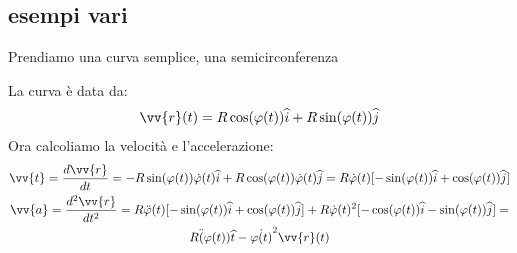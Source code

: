 \documentclass[a4paper, oneside]{article}
\begin{document}
    \subsection{esempi vari}
\begin{example}
        Prendiamo una curva semplice, una semicirconferenza
        \begin{center}
        \end{center}
        La curva è data da:
        \begin{gather*}
            \vv{r}(t) = R \cos(\varphi(t)) \widehat{i} + R \sin(\varphi(t)) \widehat{j}
        \end{gather*}
        Ora calcoliamo la velocità e l'accelerazione:
        \begin{gather*}
            \vv{t} = \frac{d\vv{r}}{dt} = - R \sin(\varphi(t)) \dot{\varphi}(t) \widehat{i} + R \cos(\varphi(t)) \dot{\varphi}(t) \widehat{j} = R \dot{\varphi}(t) [-\sin(\varphi(t)) \widehat{i} + \cos(\varphi(t)) \widehat{j}]\\
            \vv{a} = \frac{d^2 \vv{r}}{dt^2} = R \ddot{\varphi}(t) [-\sin(\varphi(t)) \widehat{i} + \cos(\varphi(t)) \widehat{j}] + R \dot{\varphi}(t)^2 [-\cos(\varphi(t)) \widehat{i} - \sin(\varphi(t)) \widehat{j}]= \\
            R \ddot(\varphi(t)) \widehat{t} - \dot{\varphi(t)}^2 \vv{r}(t)
        \end{gather*}
\end{example}
\end{document}
